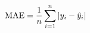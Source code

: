 \documentclass[preview]{standalone}
\begin{document}
\begin{align*}
\special{dvisvgm:raw <g id='unique000'>}\text{MAE} = \frac{1}{n}\sum_{i=1}^{n}|y_i - \hat{y}_i|\special{dvisvgm:raw </g>}
\end{align*}
\end{document}
